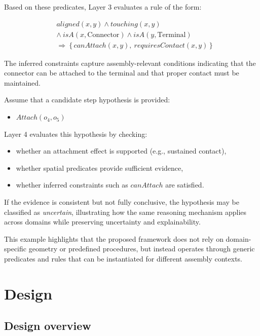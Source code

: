 \documentclass[11pt,titlepage,openright]{book}
\begin{document}
Based on these predicates, Layer 3 evaluates a rule of the form:

\begin{align*}
&aligned(x,y) \land touching(x,y) \\
&\land\ isA(x,\text{Connector}) \land isA(y,\text{Terminal}) \\
&\Rightarrow\ \{\, canAttach(x,y),\ requiresContact(x,y) \,\}
\end{align*}

The inferred constraints capture assembly-relevant conditions indicating that the connector can be attached to the terminal and that proper contact must be maintained.

Assume that a candidate step hypothesis is provided:

\begin{itemize}
\item $Attach(o_4, o_5)$
\end{itemize}

Layer 4 evaluates this hypothesis by checking:

\begin{itemize}
\item whether an attachment effect is supported (e.g., sustained contact),
\item whether spatial predicates provide sufficient evidence,
\item whether inferred constraints such as $canAttach$ are satisfied.
\end{itemize}

If the evidence is consistent but not fully conclusive, the hypothesis may be classified as \textit{uncertain}, illustrating how the same reasoning mechanism applies across domains while preserving uncertainty and explainability.

This example highlights that the proposed framework does not rely on domain-specific geometry or predefined procedures, but instead operates through generic predicates and rules that can be instantiated for different assembly contexts.



\chapter{Design}
\label{cha:design}

\section{Design overview}
\end{document}
